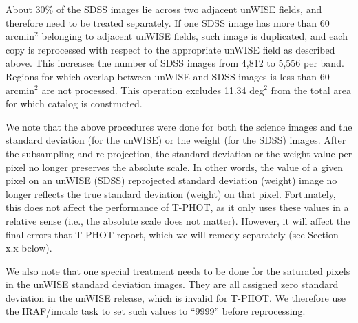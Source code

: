 \documentclass[apj,iop]{emulateapj}
\begin{document}
About 30\% of the SDSS images lie across two adjacent unWISE fields, and therefore need to be treated separately. If one SDSS image has more than 60 arcmin$^2$ belonging to adjacent unWISE fields, such image is duplicated, and each copy is reprocessed with respect to the appropriate unWISE field as described above. This increases the number of SDSS images from 4,812 to 5,556 per band. Regions for which overlap between unWISE and SDSS images is less than 60 arcmin$^2$ are not processed. This operation excludes 11.34 deg$^2$ from the total area for which catalog is constructed.

We note that the above procedures were done for both the science images and the standard deviation (for the unWISE) or the weight (for the SDSS) images. After the subsampling and re-projection, the standard deviation or the weight value per pixel no longer preserves the absolute scale. In other words, the value of a given pixel on an unWISE (SDSS) reprojected standard deviation (weight) image no longer reflects the true standard deviation (weight) on that pixel. Fortunately, this does not affect the performance of T-PHOT, as it only uses these values in a relative sense (i.e., the absolute scale does not matter). However, it will affect the final errors that T-PHOT report, which we will remedy separately (see Section x.x below).

We also note that one special treatment needs to be done for the saturated pixels in the unWISE standard deviation images. They are all assigned zero standard deviation  in the unWISE release, which is invalid for T-PHOT. We therefore use the IRAF/imcalc task to set such values to “9999” before reprocessing.
    



\end{document}
